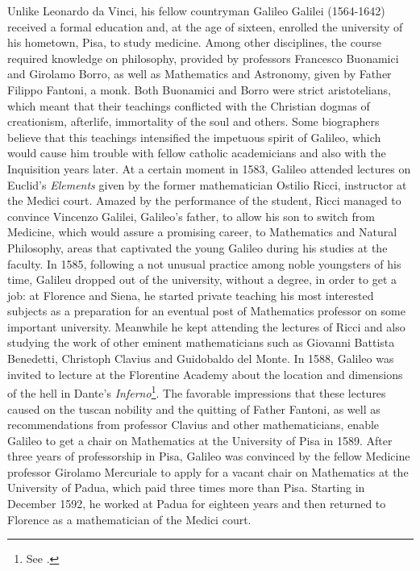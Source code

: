 Unlike Leonardo da Vinci, his fellow countryman Galileo Galilei (1564-1642) received a formal education and, at the age of sixteen, enrolled the university of his hometown, Pisa, to study medicine. Among other disciplines, the course required knowledge on philosophy, provided by professors Francesco Buonamici and Girolamo Borro, as well as Mathematics and Astronomy, given by Father Filippo Fantoni, a monk. Both Buonamici and Borro were strict aristotelians, which meant that their teachings conflicted with the Christian dogmas of creationism, afterlife, immortality of the soul and others. Some biographers believe that this teachings intensified the impetuous spirit of Galileo, which would cause him trouble with fellow catholic academicians and also with the Inquisition years later. At a certain moment in 1583, Galileo attended lectures on Euclid's \emph{Elements} given by the former mathematician Ostilio Ricci, instructor at the Medici court. Amazed by the performance of the student, Ricci managed to convince Vincenzo Galilei, Galileo's father, to allow his son to switch from Medicine, which would assure a promising career, to Mathematics and Natural Philosophy, areas that captivated the young Galileo during his studies at the faculty. In 1585, following a not unusual practice among noble youngsters of his time, Galileu dropped out of the university, without a degree, in order to get a job: at Florence and Siena, he started private teaching his most interested subjects as a preparation for an eventual post of Mathematics professor on some important university. Meanwhile he kept attending the lectures of Ricci and also studying the work of other eminent mathematicians such as Giovanni Battista Benedetti, Christoph Clavius and Guidobaldo del Monte. In 1588, Galileo was invited to lecture at the Florentine Academy about the location and dimensions of the hell in Dante's \emph{Inferno}\footnote{See \cite{wallace_1998_1}.}. The favorable impressions that these lectures caused on the tuscan nobility and the quitting of Father Fantoni, as well as recommendations from professor Clavius and other mathematicians, enable Galileo to get a chair on Mathematics at the University of Pisa in 1589. After three years of professorship in Pisa, Galileo was convinced by the fellow Medicine professor Girolamo Mercuriale to apply for a vacant chair on Mathematics at the University of Padua, which paid three times more than Pisa. Starting in December 1592, he worked at Padua for eighteen years and then returned to Florence as a mathematician of the Medici court.    
